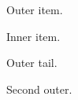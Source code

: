 \documentclass{article}
\begin{document}
\begin{enumerate}
\item Outer item. {\itemize \item Inner item.} Outer tail.
\item Second outer.
\end{enumerate}
\end{document}

